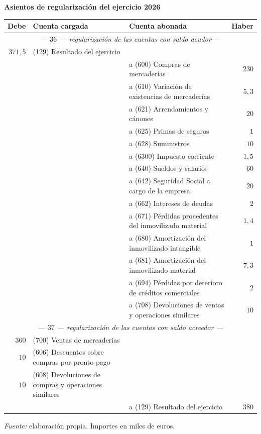 \documentclass[10pt,a4paper]{article}
\begin{document}
\begin{center}\begin{minipage}{\linewidth}\centering
{\small\textbf{Asientos de regularización del ejercicio 2026}}\par\vspace{0.3em}
{\small
\begin{tabular}{r p{5.6cm} p{6.4cm} r}
\hline
\textbf{Debe} & \textbf{Cuenta cargada} & \textbf{Cuenta abonada} & \textbf{Haber} \\
\hline
\multicolumn{4}{c}{\textit{--- $36$ --- regularización de las cuentas con saldo deudor ---}} \\
$371,5$ & (129) Resultado del ejercicio & & \\
 & & \raggedright a (600) Compras de mercaderías & $230$ \\
 & & \raggedright a (610) Variación de existencias de mercaderías & $5,3$ \\
 & & \raggedright a (621) Arrendamientos y cánones & $20$ \\
 & & \raggedright a (625) Primas de seguros & $1$ \\
 & & \raggedright a (628) Suministros & $10$ \\
 & & \raggedright a (6300) Impuesto corriente & $1,5$ \\
 & & \raggedright a (640) Sueldos y salarios & $60$ \\
 & & \raggedright a (642) Seguridad Social a cargo de la empresa & $20$ \\
 & & \raggedright a (662) Intereses de deudas & $2$ \\
 & & \raggedright a (671) Pérdidas procedentes del inmovilizado material & $1,4$ \\
 & & \raggedright a (680) Amortización del inmovilizado intangible & $1$ \\
 & & \raggedright a (681) Amortización del inmovilizado material & $7,3$ \\
 & & \raggedright a (694) Pérdidas por deterioro de créditos comerciales & $2$ \\
 & & \raggedright a (708) Devoluciones de ventas y operaciones similares & $10$ \\
\multicolumn{4}{c}{\textit{--- $37$ --- regularización de las cuentas con saldo acreedor ---}} \\
$360$ & (700) Ventas de mercaderías & & \\
$10$ & \raggedright (606) Descuentos sobre compras por pronto pago & & \\
$10$ & \raggedright (608) Devoluciones de compras y operaciones similares & & \\
 & & \raggedright a (129) Resultado del ejercicio & $380$ \\
\hline
\end{tabular}}\par\vspace{0.3em}
{\small\textit{Fuente: }elaboración propia. Importes en miles de euros.}
\end{minipage}\end{center}
\end{document}
